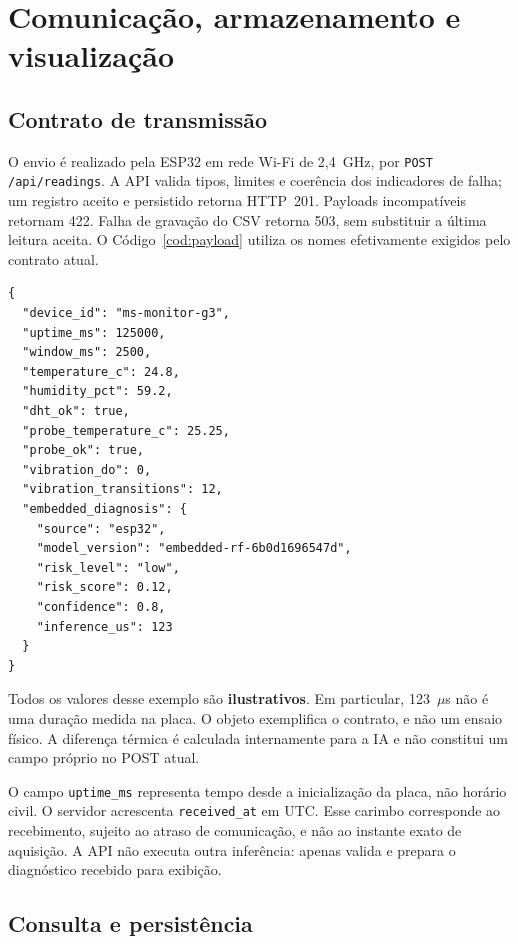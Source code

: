 \section{Comunicação, armazenamento e visualização}
\label{sec:comunicacao}

\subsection{Contrato de transmissão}

O envio é realizado pela ESP32 em rede Wi-Fi de 2,4~GHz, por
\texttt{POST /api/readings}. A API valida tipos, limites e coerência
dos indicadores de falha; um registro aceito e persistido retorna HTTP~201.
Payloads incompatíveis retornam 422. Falha de gravação do CSV retorna
503, sem substituir a última leitura aceita.
O Código~\ref{cod:payload} utiliza os nomes efetivamente exigidos
pelo contrato atual.

\begin{lstlisting}[caption={Payload ilustrativo compatível com o contrato da API},label={cod:payload}]
{
  "device_id": "ms-monitor-g3",
  "uptime_ms": 125000,
  "window_ms": 2500,
  "temperature_c": 24.8,
  "humidity_pct": 59.2,
  "dht_ok": true,
  "probe_temperature_c": 25.25,
  "probe_ok": true,
  "vibration_do": 0,
  "vibration_transitions": 12,
  "embedded_diagnosis": {
    "source": "esp32",
    "model_version": "embedded-rf-6b0d1696547d",
    "risk_level": "low",
    "risk_score": 0.12,
    "confidence": 0.8,
    "inference_us": 123
  }
}
\end{lstlisting}

Todos os valores desse exemplo são \textbf{ilustrativos}. Em particular,
123~$\mu$s não é uma duração medida na placa. O objeto exemplifica o
contrato, e não um ensaio físico. A diferença térmica é calculada
internamente para a IA e não constitui um campo próprio no POST atual.

O campo \texttt{uptime\_ms} representa tempo desde a inicialização da placa,
não horário civil. O servidor acrescenta \texttt{received\_at} em UTC.
Esse carimbo corresponde ao recebimento, sujeito ao atraso de comunicação,
e não ao instante exato de aquisição. A API não executa outra inferência:
apenas valida e prepara o diagnóstico recebido para exibição.

\subsection{Consulta e persistência}

